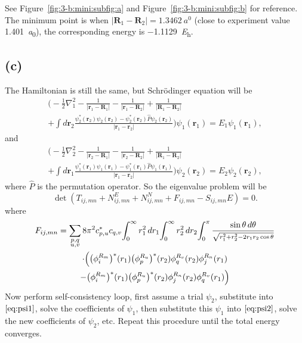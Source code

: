 \documentclass[12pt]{article}
\begin{document}
See Figure~\ref{fig:3-b:mini:subfig:a} and Figure~\ref{fig:3-b:mini:subfig:b}
for reference. The minimum point is when
$\lvert \symbf{R}_1- \symbf{R}_2 \rvert = \SI{1.3462}{\bohr}$
(close to experiment value \SI{1.401}{\bohr}), the corresponding energy is \SI{-1.1129}{\hartree}.

\subsection*{(c)}

The Hamiltonian is still the same, but Schrödinger equation will be
%
\begin{multline}\label{eq:psi1}
    \biggl(-\frac{1}{2}\nabla_1^2
    - \frac{1}{\lvert \symbf{r}_1 - \symbf{R}_1 \rvert}
    - \frac{1}{\lvert \symbf{r}_1 - \symbf{R}_2 \rvert}
    + \frac{1}{\lvert \symbf{R}_1 - \symbf{R}_2 \rvert}\\
    + \int d\symbf{r}_2
    \frac{\psi_2^\ast (\symbf{r}_2) \psi_2(\symbf{r}_2) - \psi_2^\ast (\symbf{r}_2) \hat{P} \psi_2(\symbf{r}_2)}{\lvert \symbf{r}_1 - \symbf{r}_2 \rvert}
    \biggr)
    \psi_1(\symbf{r}_1) = E_1 \psi_1(\symbf{r}_1),
\end{multline}
%
and
%
\begin{multline}\label{eq:psi2}
    \biggl(-\frac{1}{2}\nabla_2^2
    - \frac{1}{\lvert \symbf{r}_2 - \symbf{R}_1 \rvert}
    - \frac{1}{\lvert \symbf{r}_2 - \symbf{R}_2 \rvert}
    + \frac{1}{\lvert \symbf{R}_1 - \symbf{R}_2 \rvert}\\
    + \int d\symbf{r}_1
    \frac{\psi_1^\ast (\symbf{r}_1) \psi_1(\symbf{r}_1) - \psi_1^\ast (\symbf{r}_1) \hat{P} \psi_1(\symbf{r}_1)}{\lvert \symbf{r}_1 - \symbf{r}_2 \rvert}
    \biggr)
    \psi_2(\symbf{r}_2) = E_2 \psi_2(\symbf{r}_2),
\end{multline}
%
where $\hat{P}$ is the permutation operator. So the eigenvalue problem will be
%
\begin{equation}
    \det(T_{ij, mn} + N^E_{ij, mn} + N^N_{ij, mn} + F_{ij, mn} - S_{ij, mn} E) = 0.
\end{equation}
%
where
%
\begin{multline}
    F_{ij, mn} = \sum_{\substack{p, q\\u, v}} 8\pi^2 c_{p, u}^\ast c_{q, v}
    \! \int_{0}^{\infty} r_1^2  \, dr_1 \! \int_{0}^{\infty} r_2^2 \, dr_2 \! \int_{0}^{\pi}
    \frac{\sin\theta\, d\theta}{\mathsmaller{\sqrt{r_1^2 + r_2^2 - 2 r_1 r_2 \cos\theta}}}\\
    \cdot \Bigl(
    \bigl( \phi_i^{R_m} \bigr)^\ast(r_1) \bigl(\phi_p^{R_u} \bigr)^\ast(r_2) \phi_q^{R_v}(r_2)\phi_j^{R_n}(r_1)\\
    - \bigl( \phi_i^{R_m} \bigr)^\ast(r_1) \bigl(\phi_p^{R_u} \bigr)^\ast(r_2) \phi_j^{R_n}(r_2)\phi_q^{R_v}(r_1)
    \Bigr)
\end{multline}
%
Now perform self-consistency loop, first assume a trial $\psi_2$, substitute into
$\eqref{eq:psi1}$, solve the coefficients of $\psi_1$, then substitute this $\psi_1$
into $\eqref{eq:psi2}$, solve the new coefficients of $\psi_2$, etc. Repeat this procedure
until the total energy converges.
\end{document}
